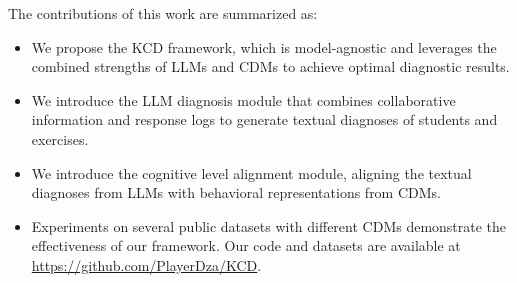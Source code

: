 The contributions of this work are summarized as:

\begin{itemize}
   \item We propose the KCD framework, which is model-agnostic and leverages the combined strengths of LLMs and CDMs to achieve optimal diagnostic results.
   \item We introduce the LLM diagnosis module that combines collaborative information and response logs to generate textual diagnoses of students and exercises.%
    \item We introduce the cognitive level alignment module, aligning the textual diagnoses from LLMs with behavioral representations from CDMs.
    \item Experiments on several public datasets with different CDMs demonstrate the effectiveness of our framework. Our code and datasets are available at \url{https://github.com/PlayerDza/KCD}.
\end{itemize}

